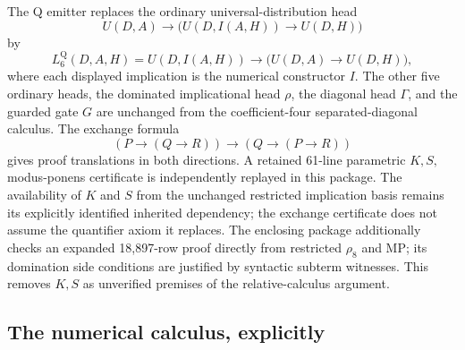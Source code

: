 The Q emitter replaces the ordinary universal-distribution head
\[
 U(D,A)\longrightarrow
       \bigl(U(D,I(A,H))\longrightarrow U(D,H)\bigr)
\]
by
\[
 L_6^{\mathrm Q}(D,A,H)=
 U(D,I(A,H))\longrightarrow
       \bigl(U(D,A)\longrightarrow U(D,H)\bigr),
 \tag{Q}
\]
where each displayed implication is the numerical constructor $I$.
The other five ordinary heads, the dominated implicational head $\rho$,
the diagonal head $\Gamma$, and the guarded gate $G$ are unchanged from
the coefficient-four separated-diagonal calculus. The exchange formula
\[
 (P\longrightarrow(Q\longrightarrow R))\longrightarrow
       (Q\longrightarrow(P\longrightarrow R))
\]
gives proof translations in both directions. A retained 61-line
parametric $K,S,$ modus-ponens certificate is independently replayed in
this package. The availability of $K$ and $S$ from the unchanged restricted
implication basis remains its explicitly identified inherited dependency;
the exchange certificate does not assume the quantifier axiom it replaces.
The enclosing package additionally checks an expanded 18,897-row proof
directly from restricted $\rho_8$ and MP; its domination side conditions
are justified by syntactic subterm witnesses. This removes $K,S$ as
unverified premises of the relative-calculus argument.

\subsection{The numerical calculus, explicitly}

